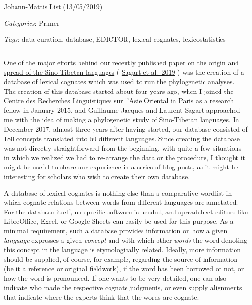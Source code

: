 \documentclass[
  a4paper,
  14pt,
  oneside,
  tablecaptionabove
]{scrbook}
\begin{document}
Johann-Mattis List (13/05/2019)

\emph{Categories}: Primer

\emph{Tags}: data curation, database, EDICTOR, lexical cognates,
lexicostatistics

\begin{center}\rule{0.5\linewidth}{1pt}\end{center}

One of the major efforts behind our recently published paper on the
\href{https://www.pnas.org/content/early/2019/04/30/1817972116}{origin
and spread of the Sino-Tibetan languages} (
\href{http://bibliography.lingpy.org?key=Sagart2019}{Sagart et al.~2019}
) was the creation of a database of lexical cognates which was used to
run the phylogenetic analyses. The creation of this database started
about four years ago, when I joined the Centre des Recherches
Linguistiques sur l'Asie Oriental in Paris as a research fellow in
January 2015, and Guillaume Jacques and Laurent Sagart approached me
with the idea of making a phylogenetic study of Sino-Tibetan languages.
In December 2017, almost three years after having started, our database
consisted of 180 concepts translated into 50 different languages. Since
creating the database was not directly straightforward from the
beginning, with quite a few situations in which we realized we had to
re-arrange the data or the procedure, I thought it might be useful to
share our experience in a series of blog posts, as it might be
interesting for scholars who wish to create their own database.

A database of lexical cognates is nothing else than a comparative
wordlist in which cognate relations between words from different
languages are annotated. For the database itself, no specific software
is needed, and spreadsheet editors like LibreOffice, Excel, or Google
Sheets can easily be used for this purpose. As a minimal requirement,
such a database provides information on how a given \emph{language}
expresses a given \emph{concept} and with which other \emph{words} the
word denoting this concept in the language is etymologically related.
Ideally, more information should be supplied, of course, for example,
regarding the source of information (be it a reference or original
fieldwork), if the word has been borrowed or not, or how the word is
pronounced. If one wants to be very detailed, one can also indicate who
made the respective cognate judgments, or even supply alignments that
indicate where the experts think that the words are cognate.
\end{document}

